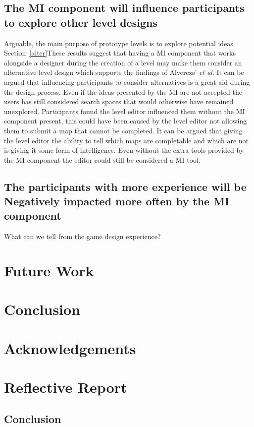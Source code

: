 \documentclass[journal]{IEEEtran}
\begin{document}
\subsection{The MI component will influence participants to explore other level designs}
Arguable, the main purpose of prototype levels is to explore potential ideas. Section~\ref{alter}These results suggest that having a MI component that works alongside a designer during the creation of a level may make them consider an alternative level design which supports the findings of Alverezs' \textit{et al}\cite{alvarez2018fostering}. It can be argued that influencing participants to consider alternatives is a great aid during the design process. Even if the ideas presented by the MI are not accepted the users has still considered search spaces that would otherwise have remained unexplored. Participants found the level editor influenced them without the MI component present, this could have been caused by the level editor not allowing them to submit a map that cannot be completed. It can be argued that giving the level editor the ability to tell which maps are completable and which are not is giving it some form of intelligence. Even without the extra tools provided by the MI component the editor could still be considered a MI tool.

\subsection{The participants with more experience will be Negatively impacted more often by the MI component}
What can we tell from the game design experience?

\section{Future Work}


\section{Conclusion}






\appendices
	\section{Acknowledgements}

	\section{Reflective Report}

	\subsection{Conclusion}




\end{document}
